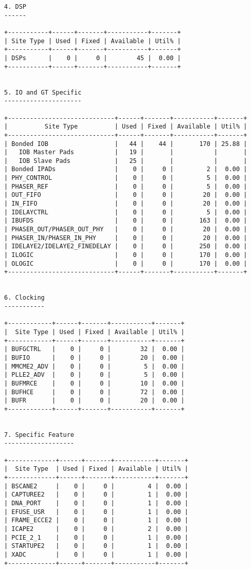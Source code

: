 \begin{verbatim}
4. DSP
------

+-----------+------+-------+-----------+-------+
| Site Type | Used | Fixed | Available | Util% |
+-----------+------+-------+-----------+-------+
| DSPs      |    0 |     0 |        45 |  0.00 |
+-----------+------+-------+-----------+-------+


5. IO and GT Specific
---------------------

+-----------------------------+------+-------+-----------+-------+
|          Site Type          | Used | Fixed | Available | Util% |
+-----------------------------+------+-------+-----------+-------+
| Bonded IOB                  |   44 |    44 |       170 | 25.88 |
|   IOB Master Pads           |   19 |       |           |       |
|   IOB Slave Pads            |   25 |       |           |       |
| Bonded IPADs                |    0 |     0 |         2 |  0.00 |
| PHY_CONTROL                 |    0 |     0 |         5 |  0.00 |
| PHASER_REF                  |    0 |     0 |         5 |  0.00 |
| OUT_FIFO                    |    0 |     0 |        20 |  0.00 |
| IN_FIFO                     |    0 |     0 |        20 |  0.00 |
| IDELAYCTRL                  |    0 |     0 |         5 |  0.00 |
| IBUFDS                      |    0 |     0 |       163 |  0.00 |
| PHASER_OUT/PHASER_OUT_PHY   |    0 |     0 |        20 |  0.00 |
| PHASER_IN/PHASER_IN_PHY     |    0 |     0 |        20 |  0.00 |
| IDELAYE2/IDELAYE2_FINEDELAY |    0 |     0 |       250 |  0.00 |
| ILOGIC                      |    0 |     0 |       170 |  0.00 |
| OLOGIC                      |    0 |     0 |       170 |  0.00 |
+-----------------------------+------+-------+-----------+-------+


6. Clocking
-----------

+------------+------+-------+-----------+-------+
|  Site Type | Used | Fixed | Available | Util% |
+------------+------+-------+-----------+-------+
| BUFGCTRL   |    0 |     0 |        32 |  0.00 |
| BUFIO      |    0 |     0 |        20 |  0.00 |
| MMCME2_ADV |    0 |     0 |         5 |  0.00 |
| PLLE2_ADV  |    0 |     0 |         5 |  0.00 |
| BUFMRCE    |    0 |     0 |        10 |  0.00 |
| BUFHCE     |    0 |     0 |        72 |  0.00 |
| BUFR       |    0 |     0 |        20 |  0.00 |
+------------+------+-------+-----------+-------+


7. Specific Feature
-------------------

+-------------+------+-------+-----------+-------+
|  Site Type  | Used | Fixed | Available | Util% |
+-------------+------+-------+-----------+-------+
| BSCANE2     |    0 |     0 |         4 |  0.00 |
| CAPTUREE2   |    0 |     0 |         1 |  0.00 |
| DNA_PORT    |    0 |     0 |         1 |  0.00 |
| EFUSE_USR   |    0 |     0 |         1 |  0.00 |
| FRAME_ECCE2 |    0 |     0 |         1 |  0.00 |
| ICAPE2      |    0 |     0 |         2 |  0.00 |
| PCIE_2_1    |    0 |     0 |         1 |  0.00 |
| STARTUPE2   |    0 |     0 |         1 |  0.00 |
| XADC        |    0 |     0 |         1 |  0.00 |
+-------------+------+-------+-----------+-------+



\end{verbatim}
